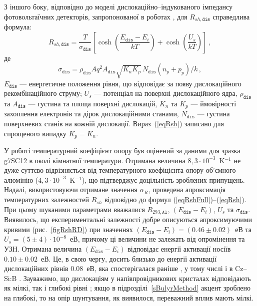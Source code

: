 З іншого боку, відповідно до моделі дислокаційно--індукованого імпедансу фотовольтаїчних детекторів,
запропонованої в роботах \cite{Rsh:Gopal2003,Rsh:Gopal2004},
для $R_{sh,\mathtt{dis}}$ справедлива формула:
\begin{equation}
\label{eqRsh}
R_{sh,\mathtt{dis}}=\frac{T}{\sigma_{\mathtt{dis}}}\left[\cosh\left(\frac{E_\mathtt{dis}-E_i}{kT}\right)+\cosh\left(\frac{U_s}{kT}\right)\right]\,,
\end{equation}
де
\begin{equation}
\label{eqRdis}
\sigma_{\mathtt{dis}}=\rho_{\mathtt{dis}}Aq^2A_{\mathtt{dis}}\sqrt{K_nK_p}\,N_{\mathtt{dis}}(n_p+p_p)/k\,,
\end{equation}
$E_{\mathtt{dis}}$ --- енергетичне положення рівня, що відповідає за появу
дислокаційного рекомбінаційного струму;
$U_s$ --- потенціал на поверхні дислокаційного ядра,
$\rho_{\mathtt{dis}}$ та $A_{\mathtt{dis}}$ --- густина та площа поверхні дислокацій,
$K_n$ та $K_p$ --- ймовірності захоплення електронів та дірок дислокаційними станами,
$N_{\mathtt{dis}}$ --- густина поверхневих станів на кожній дислокації.
Вираз~(\ref{eqRsh}) записано для спрощеного випадку $K_p=K_n$.

У роботі температурний коефіцієнт опору був оцінений за даними для зразка g7SC12 в околі кімнатної температури.
Отримана величина $8,3\cdot10^{-3}$~K$^{-1}$ не дуже суттєво відрізняється від температурного
коефіцієнта опору об'ємного алюмінію ($4,3\cdot10^{-3}$~K$^{-1}$),
що підтверджує доцільність зроблених припущень.
Надалі, використовуючи отримане значення $\alpha_R$,
проведена апроксимація температурних залежностей $R_{sh}$ відповідно до формул (\ref{eqRshFull})--(\ref{eqRsh}).
При цьому шуканими параметрами вважалися $R_{293,\mathtt{Al}}$, $(E_{\mathtt{dis}}-E_i)$, $U_s$ та $\sigma_{\mathtt{dis}}$.
Виявилось, що експериментальні залежності добре описуються апроксимуючими кривими (рис.~\ref{figRshRD})
при значеннях $(E_{\mathtt{dis}}-E_i)=(0.46\pm0.02)$~еВ та $U_s=(5\pm4)\cdot10^{-8}$~еВ,
причому ці величини не залежать від опромінення та УЗН.
Отримана величина $(E_{\mathtt{dis}}-E_i)$ відповідає енергії активації носіїв $0.10\pm0.02$~еВ.
Це, в свою чергу, досить близько до енергії активації дислокаційних рівнів $0.08$~еВ,
яка спостерігалася раніше \cite{disl10:Castaldini,disl10:Isakova,disl10:Yur,disl10:Kveder,disl10:Trushin,Si:disl},
у тому числі і в Cz--Si:B \cite{disl10:Castaldini,disl10:Isakova,disl10:Yu}.
Зауважимо, що дислокаціям у напівпровідникових кристалах відповідають як мілкі,
так і глибокі рівні \cite{Disl:GaN};
якщо в підрозділі~\ref{sBulyrMethod} акцент зроблено на глибокі, то на  опір шунтування, як виявилося,
переважний вплив мають мілкі.


